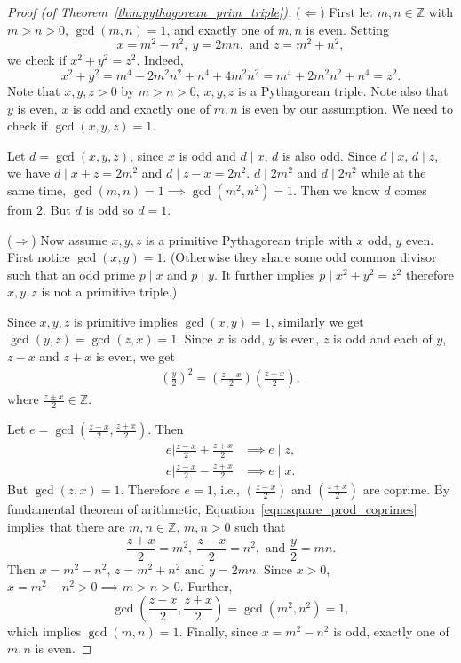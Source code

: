 \documentclass{amsbook}
\theoremstyle{plain}
\theoremstyle{definition}
\theoremstyle{remark}
\numberwithin{equation}{chapter}
\numberwithin{figure}{chapter}
\newcommand{\Z}{\mathbb{Z}}
\begin{document}
\begin{proof}[Proof {\rm (of Theorem~\ref{thm:pythagorean_prim_triple})}]
  ($\Leftarrow$) First let $m, n \in \Z$ with $m > n > 0$, $\gcd (m, n) = 1$, and exactly one of $m, n$ is even. Setting
  \[
    x = m^2 - n^2, ~y = 2mn, \text{ and } z = m^2 + n^2,
  \]
  we check if $x^2 + y^2 = z^2$. Indeed,
  \[
    x^2 + y^2 = m^4 - 2 m^2 n^2 + n^4 + 4 m^2 n^2 = m^4 + 2 m^2 n^2 + n^4 = z^2.
  \]
  Note that $x, y, z > 0$ by $m > n > 0$, $x, y, z$ is a Pythagorean triple. Note also that $y$ is even, $x$ is odd and exactly one of $m, n$ is even by our assumption. We need to check if $\gcd (x, y, z) = 1$.

  Let $d = \gcd (x, y, z)$, since $x$ is odd and $d \mid x$, $d$ is also odd. Since $d \mid x$, $d \mid z$, we have $d \mid x + z = 2m^2$ and $d \mid z - x = 2n^2$. $d \mid 2m^2$ and $d \mid 2n^2$ while at the same time, $\gcd (m, n) = 1 \implies \gcd (m^2, n^2) = 1$. Then we know $d$ comes from $2$. But $d$ is odd so $d = 1$.

  ($\Rightarrow$) Now assume $x, y, z$ is a primitive Pythagorean triple with $x$ odd, $y$ even. First notice $\gcd (x, y) = 1$. (Otherwise they share some odd common divisor such that an odd prime $p \mid x$ and $p \mid y$. It further implies $p \mid x^2 + y^2 = z^2$ therefore $x, y, z$ is not a primitive triple.)

  Since $x, y, z$ is primitive implies $\gcd (x, y) = 1$, similarly we get $\gcd (y, z) = \gcd (z, x) = 1$. Since $x$ is odd, $y$ is even, $z$ is odd and each of $y$, $z - x$ and $z + x$ is even, we get
  \begin{align}\label{eqn:square_prod_coprimes}
    \left( \frac{y} 2\right)^2 = \left( \frac{z - x}2 \right) \left( \frac{z +x } 2 \right),
  \end{align}
  where $\frac{z \pm x}2 \in \Z$.

  Let $e = \gcd \left( \frac{z - x}2, \frac{z + x}2 \right)$. Then
  \begin{align}
    e \mathrel{\bigg|} \frac{z - x}2 + \frac{z + x}2 &\implies e \mid z, \\
    e \mathrel{\bigg|} \frac{z - x}2 - \frac{z + x}2 &\implies e \mid x.
  \end{align}
  But $\gcd (z, x) = 1$. Therefore $e = 1$, i.e., $\left( \frac{z - x}2 \right)$ and $\left( \frac{z + x}2 \right)$ are coprime. By fundamental theorem of arithmetic, Equation~\eqref{eqn:square_prod_coprimes} implies that there are $m, n \in \Z$, $m, n > 0$ such that
  \[
    \frac{z + x}2 = m^2, ~\frac{z - x}2 = n^2, \text{ and } \frac{y}2 = mn.
  \]
  Then $x = m^2 - n^2$, $z = m^2 + n^2$ and $y = 2mn$. Since $x > 0$, $x = m^2 - n^2 > 0 \implies m > n > 0$. Further,
  \[
  \gcd \left( \frac{z - x}2, \frac{z + x}2 \right) = \gcd (m^2, n^2) = 1, 
  \]
  which implies $\gcd (m, n) = 1$.
  Finally, since $x = m^2 - n^2$ is odd, exactly one of $m, n$ is even.
\end{proof}
\end{document}

